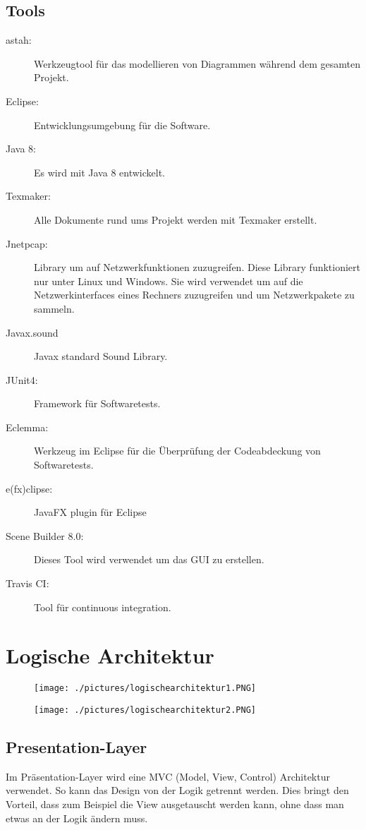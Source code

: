 \documentclass[a4,12pt]{scrartcl}
\begin{document}
\subsection{Tools}
\begin{description}
\item [astah:] Werkzeugtool für das modellieren von Diagrammen während dem gesamten Projekt.
\item [Eclipse:] Entwicklungsumgebung für die Software.
\item [Java 8:] Es wird mit Java 8 entwickelt. 
\item [Texmaker:] Alle Dokumente rund ums Projekt werden mit Texmaker erstellt. 
\item [Jnetpcap:] Library um auf Netzwerkfunktionen zuzugreifen. Diese Library funktioniert nur unter Linux und Windows. Sie wird verwendet um auf die Netzwerkinterfaces eines Rechners zuzugreifen und um Netzwerkpakete zu sammeln.
\item [Javax.sound] Javax standard Sound Library.
\item [JUnit4:] Framework für Softwaretests.
\item [Eclemma:] Werkzeug im Eclipse für die Überprüfung der Codeabdeckung von Softwaretests. 
\item [e(fx)clipse:] JavaFX plugin für Eclipse
\item [Scene Builder 8.0:] Dieses Tool wird verwendet um das GUI zu erstellen. 
\item [Travis CI:] Tool für continuous integration.
\end{description}

\section{Logische Architektur}
\begin{figure} [H]
	\begin{center}
	\texttt{[image: ./pictures/logischearchitektur1.PNG]}
	\label{Bild Referenz}
	\end{center}
\end{figure}
\begin{figure} [H]
	\begin{center}
	\texttt{[image: ./pictures/logischearchitektur2.PNG]}
	\label{Bild Referenz}
	\end{center}
\end{figure}
\subsection{Presentation-Layer}
Im Präsentation-Layer wird eine MVC (Model, View, Control) Architektur verwendet. So kann das Design von der Logik getrennt werden. Dies bringt den Vorteil, dass zum Beispiel die View ausgetauscht werden kann, ohne dass man etwas an der Logik ändern muss.
\end{document}

